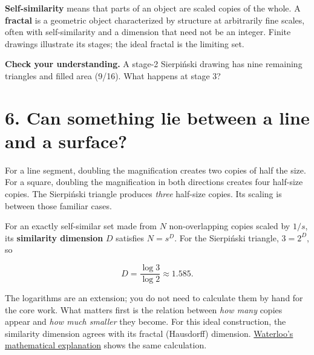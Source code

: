 \documentclass[11pt,letterpaper]{article}
\begin{document}
\textbf{Self-similarity} means that parts of an object are scaled copies of the whole. A \textbf{fractal} is a geometric object characterized by structure at arbitrarily fine scales, often with self-similarity and a dimension that need not be an integer. Finite drawings illustrate its stages; the ideal fractal is the limiting set.

\begin{tcolorbox}[title={Pause and try 4},breakable]
\textbf{Check your understanding.} A stage-2 Sierpiński drawing has nine remaining triangles and filled area (9/16). What happens at stage 3?
\end{tcolorbox}




\section{6. Can something lie between a line and a surface?}


For a line segment, doubling the magnification creates two copies of half the size. For a square, doubling the magnification in both directions creates four half-size copies. The Sierpiński triangle produces \emph{three} half-size copies. Its scaling is between those familiar cases.



\par{}\par\medskip


For an exactly self-similar set made from \(N\) non-overlapping copies scaled by \(1/s\), its \textbf{similarity dimension} \(D\) satisfies \(N=s^D\). For the Sierpiński triangle, \(3=2^D\), so


\[D=\frac{\log 3}{\log 2}\approx1.585.\]

The logarithms are an extension; you do not need to calculate them by hand for the core work. What matters first is the relation between \emph{how many} copies appear and \emph{how much smaller} they become. For this ideal construction, the similarity dimension agrees with its fractal (Hausdorff) dimension. \href{https://cemc.uwaterloo.ca/sites/default/files/documents/2024/Grade1112_20230308_DynamicalSystemsAndFractals2.html}{Waterloo's mathematical explanation} shows the same calculation.
\end{document}

